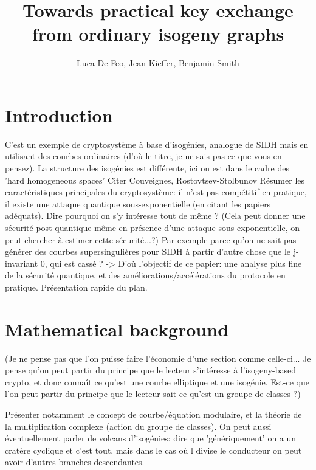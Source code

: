 \documentclass{article}
\title{Towards practical key exchange from ordinary isogeny graphs}
\author{Luca De Feo, Jean Kieffer, Benjamin Smith}
\begin{document}
\maketitle

\begin{abstract}
  
\end{abstract}

\section{Introduction}

C'est un exemple de cryptosystème à base d'isogénies, analogue de SIDH
mais en utilisant des courbes ordinaires (d'où le titre, je ne sais
pas ce que vous en pensez).  La structure des isogénies est
différente, ici on est dans le cadre des 'hard homogeneous spaces'
Citer Couveignes, Rostovtsev-Stolbunov Résumer les caractéristiques
principales du cryptosystème: il n'est pas compétitif en pratique, il
existe une attaque quantique sous-exponentielle (en citant les papiers
adéquats).  Dire pourquoi on s'y intéresse tout de même ? (Cela peut
donner une sécurité post-quantique même en présence d'une attaque
sous-exponentielle, on peut chercher à estimer cette sécurité...?) Par
exemple parce qu'on ne sait pas générer des courbes supersingulières
pour SIDH à partir d'autre chose que le j-invariant 0, qui est cassé ?
-> D'où l'objectif de ce papier: une analyse plus fine de la sécurité
quantique, et des améliorations/accélérations du protocole en
pratique.  Présentation rapide du plan.

\section{Mathematical background}

(Je ne pense pas que l'on puisse faire l'économie d'une section comme
celle-ci... Je pense qu'on peut partir du principe que le lecteur
s'intéresse à l'isogeny-based crypto, et donc connaît ce qu'est une
courbe elliptique et une isogénie. Est-ce que l'on peut partir du
principe que le lecteur sait ce qu'est un groupe de classes ?)

Présenter notamment le concept de courbe/équation modulaire, et la
théorie de la multiplication complexe (action du groupe de classes).
On peut aussi éventuellement parler de volcans d'isogénies: dire que
'génériquement' on a un cratère cyclique et c'est tout, mais dans le
cas où l divise le conducteur on peut avoir d'autres branches
descendantes.
\end{document}
